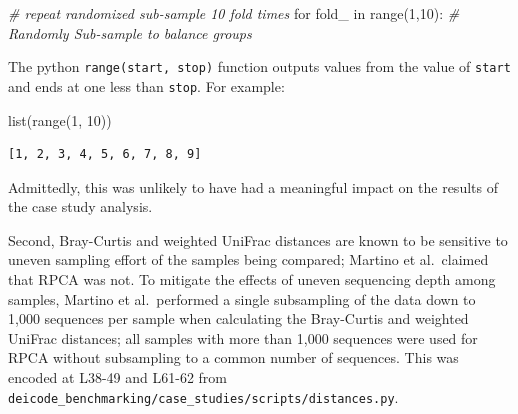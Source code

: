 \documentclass[
]{article}
\newenvironment{Shaded}{}{}
\newcommand{\BuiltInTok}[1]{\textcolor[rgb]{0.65,0.15,0.64}{#1}}
\newcommand{\CommentTok}[1]{\textcolor[rgb]{0.63,0.63,0.65}{\textit{#1}}}
\newcommand{\ControlFlowTok}[1]{\textcolor[rgb]{0.65,0.15,0.64}{#1}}
\newcommand{\DecValTok}[1]{\textcolor[rgb]{0.60,0.41,0.00}{#1}}
\newcommand{\KeywordTok}[1]{\textcolor[rgb]{0.65,0.15,0.64}{#1}}
\newcommand{\NormalTok}[1]{\textcolor[rgb]{0.22,0.23,0.26}{#1}}
\begin{document}
\footnotesize

\begin{Shaded}
\begin{Highlighting}[numbers=left,,firstnumber=44,]
\CommentTok{\# repeat randomized sub{-}sample 10 fold times}
\ControlFlowTok{for}\NormalTok{ fold\_ }\KeywordTok{in} \BuiltInTok{range}\NormalTok{(}\DecValTok{1}\NormalTok{,}\DecValTok{10}\NormalTok{):}
    \CommentTok{\# Randomly Sub{-}sample to balance groups}
\end{Highlighting}
\end{Shaded}

\normalsize{}

The python \texttt{range(start,\ stop)} function outputs values from the
value of \texttt{start} and ends at one less than \texttt{stop}. For
example:

\begin{Shaded}
\begin{Highlighting}[numbers=left,,]
\BuiltInTok{list}\NormalTok{(}\BuiltInTok{range}\NormalTok{(}\DecValTok{1}\NormalTok{, }\DecValTok{10}\NormalTok{))}
\end{Highlighting}
\end{Shaded}

\begin{verbatim}
[1, 2, 3, 4, 5, 6, 7, 8, 9]
\end{verbatim}

Admittedly, this was unlikely to have had a meaningful impact on the
results of the case study analysis.

Second, Bray-Curtis and weighted UniFrac distances are known to be
sensitive to uneven sampling effort of the samples being compared;
Martino et al.~claimed that RPCA was not. To mitigate the effects of
uneven sequencing depth among samples, Martino et al.~performed a single
subsampling of the data down to 1,000 sequences per sample when
calculating the Bray-Curtis and weighted UniFrac distances; all samples
with more than 1,000 sequences were used for RPCA without subsampling to
a common number of sequences. This was encoded at L38-49 and L61-62 from
\texttt{deicode\_benchmarking/case\_studies/scripts/distances.py}.

\footnotesize
\end{document}

